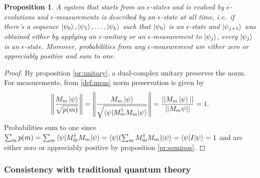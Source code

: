 \documentclass{article}
\newtheorem{proposition}[theorem]{Proposition}
\newcommand{\e}{\epsilon}
\newcommand{\norm}[1]{\left\lVert#1\right\rVert}
\begin{document}
\begin{proposition}\label{pr:consistency}
A system that starts from an $\e$-states and is evolved by $\e$-evolutions and $\e$-measurements is described by an $\e$-state at all time, i.e.\ if there's a sequence $\ket{\psi_0}, \ket{\psi_1}, \dots, \ket{\psi_k}$ such that $\ket{\psi_0}$ is an $\e$-state and $\ket{\psi_{j+1}}$ was obtained either by applying an $\e$-unitary or an $\e$-measurement to $\ket{\psi_j}$, every $\ket{\psi_j}$ is an $\e$-state. Moreover, probabilities from any $\e$-measurement are either zero or appreciably positive and sum to one.
\end{proposition}
\begin{proof}
By proposition \ref{pr:unitary}, a dual-complex unitary preserves the norm. For measurements, from \ref{def:meas} norm preservation is given by
\begin{equation}
\norm{\frac{M_m \ket\psi}{\sqrt{p(m)}}} = \norm{\frac{M_m \ket\psi}{\sqrt{\braket{\psi|M_m^\dagger M_m|\psi}}}} = \frac{||M_m \ket\psi||}{||M_m\psi||} = 1.
\end{equation}
Probabilities sum to one since $\sum_m p(m) = \sum_m \braket{\psi|M_m^\dagger M_m|\psi} = \braket{\psi|(\sum_m M_m^\dagger M_m)|\psi} = \braket{\psi|I|\psi} = 1$ and are either zero or appreciably positive by proposition \ref{pr:semipos}.
\end{proof}

\subsubsection*{Consistency with traditional quantum theory}


\end{document}
